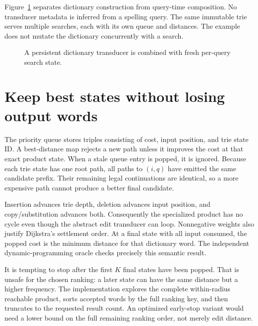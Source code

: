 Figure~\ref{fig:ch80-components} separates dictionary construction from query-time composition.
No transducer metadata is inferred from a spelling query.
The same immutable trie serves multiple searches, each with its own queue and distances.
The example does not mutate the dictionary concurrently with a search.

\begin{figure}[htbp]
\centering
{}
\caption{A persistent dictionary transducer is combined with fresh per-query search state.}
\label{fig:ch80-components}
\end{figure}

\section{Keep best states without losing output words}
\label{sec:ch80-best}
The priority queue stores triples consisting of cost, input position, and trie state ID.
A best-distance map rejects a new path unless it improves the cost at that exact product state.
When a stale queue entry is popped, it is ignored.
Because each trie state has one root path, all paths to $(i,q)$ have emitted the same candidate prefix.
Their remaining legal continuations are identical, so a more expensive path cannot produce a better final candidate.

Insertion advances trie depth, deletion advances input position, and copy/substitution advances both.
Consequently the specialized product has no cycle even though the abstract edit transducer can loop.
Nonnegative weights also justify Dijkstra's settlement order.
At a final state with all input consumed, the popped cost is the minimum distance for that dictionary word.
The independent dynamic-programming oracle checks precisely this semantic result.

It is tempting to stop after the first $K$ final states have been popped.
That is unsafe for the chosen ranking: a later state can have the same distance but a higher frequency.
The implementation explores the complete within-radius reachable product, sorts accepted words by the full ranking key, and then truncates to the requested result count.
An optimized early-stop variant would need a lower bound on the full remaining ranking order, not merely edit distance.

